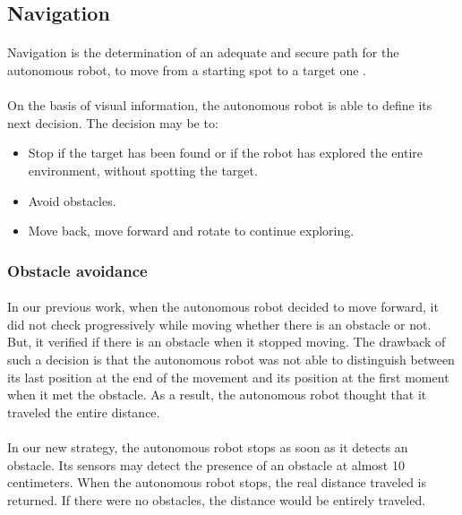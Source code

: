 \documentclass[12pt]{report}
\begin{document}
 \subsection{Navigation}
     \paragraph{}
 Navigation is the determination of an adequate and secure path for the autonomous robot, to move from a starting spot to a target one \cite{bonin-font_visual_2008}.
 \paragraph{}
 On the basis of visual information, the autonomous robot is able to define its next decision. The decision may be to:
 \begin{itemize}
 	\item Stop if the target has been found or if the robot has explored the entire environment, without spotting the target.
 	\item Avoid obstacles.
 	\item Move back, move forward and rotate to continue exploring.
 \end{itemize}

\subsubsection{Obstacle avoidance}
\paragraph{}
In our previous work, when the autonomous robot decided to move forward, it did not check progressively while moving whether there is an obstacle or not. But, it verified if there is an obstacle when it stopped moving. The drawback of such a decision is that the autonomous robot was not able to distinguish between its last position at the end of the movement and its position at the first moment when it met the obstacle. As a result, the autonomous robot thought that it traveled the entire distance.

\paragraph{}
In our new strategy, the autonomous robot stops as soon as it detects an obstacle. Its sensors may detect the presence of an obstacle at almost 10 centimeters. When the autonomous robot stops, the real distance traveled is returned. If there were no obstacles, the distance would be entirely traveled.
\end{document}

